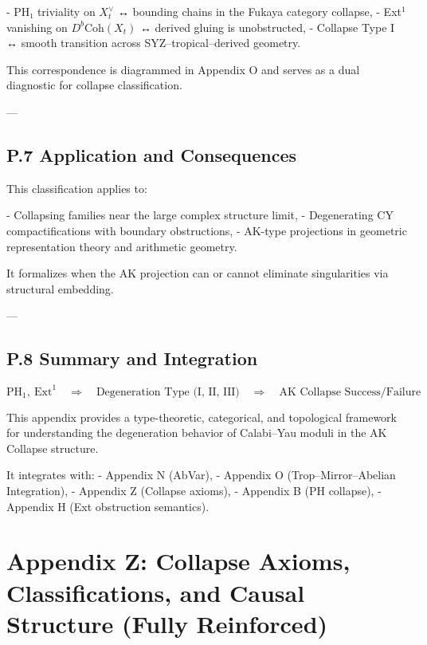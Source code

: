 \documentclass[11pt]{article}
\begin{document}
\begin{axiom}
\begin{axiom}
{{- PH₁ triviality on \( X_t^\vee \) ↔ bounding chains in the Fukaya category collapse,
- Ext$^1$ vanishing on \( D^b\mathrm{Coh}(X_t) \) ↔ derived gluing is unobstructed,
- Collapse Type I ↔ smooth transition across SYZ–tropical–derived geometry.

This correspondence is diagrammed in Appendix O and serves as a dual diagnostic for collapse classification.

---

\subsection*{P.7 Application and Consequences}

This classification applies to:

- Collapsing families near the large complex structure limit,
- Degenerating CY compactifications with boundary obstructions,
- AK-type projections in geometric representation theory and arithmetic geometry.

It formalizes when the AK projection can or cannot eliminate singularities via structural embedding.

---

\subsection*{P.8 Summary and Integration}

\[
\boxed{
\mathrm{PH}_1,\ \mathrm{Ext}^1 \quad \Rightarrow \quad \text{Degeneration Type (I, II, III)} \quad \Rightarrow \quad \text{AK Collapse Success/Failure}
}
\]

This appendix provides a type-theoretic, categorical, and topological framework  
for understanding the degeneration behavior of Calabi–Yau moduli in the AK Collapse structure.

It integrates with:
- Appendix N (AbVar),
- Appendix O (Trop–Mirror–Abelian Integration),
- Appendix Z (Collapse axioms),
- Appendix B (PH collapse),
- Appendix H (Ext obstruction semantics).






\section*{Appendix Z: Collapse Axioms, Classifications, and Causal Structure (Fully Reinforced)}

}}
\end{axiom}
\end{axiom}
\end{document}
